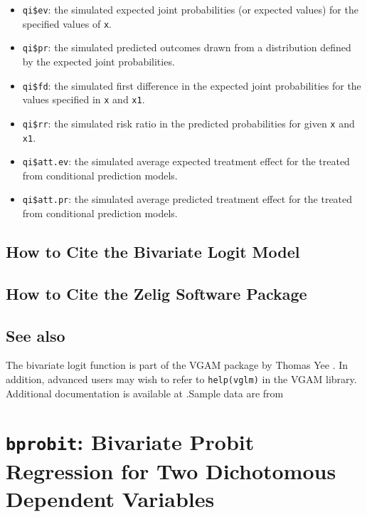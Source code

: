 \documentclass{article}
\begin{document}
\begin{itemize}
   \begin{itemize}
   \item {\tt qi\$ev}: the simulated expected joint probabilities (or expected
     values) for the specified values of {\tt x}.  
   \item {\tt qi\$pr}: the simulated predicted outcomes drawn from a
     distribution defined by the expected joint probabilities.
   \item {\tt qi\$fd}: the simulated first difference in the
     expected joint probabilities for the values specified in {\tt x} and
     {\tt x1}.
   \item {\tt qi\$rr}: the simulated risk ratio in the predicted
     probabilities for given {\tt x} and {\tt x1}.
   \item {\tt qi\$att.ev}: the simulated average expected treatment
     effect for the treated from conditional prediction models.  
   \item {\tt qi\$att.pr}: the simulated average predicted treatment
     effect for the treated from conditional prediction models.  
   \end{itemize}
\end{itemize}

\subsection*{How to Cite the Bivariate Logit Model}

\subsection*{How to Cite the Zelig Software Package}
\CiteZelig

\subsection*{See also}
The bivariate logit function is part of the VGAM package by Thomas Yee \citep{YeeHas03}. In addition, advanced users may wish to refer to \texttt{help(vglm)} 
in the VGAM library.  Additional documentation is available at
.Sample data are from \cite{Martin92}

\section{{\tt bprobit}: Bivariate Probit Regression for Two
Dichotomous Dependent Variables}\label{bprobit}
\end{document}
